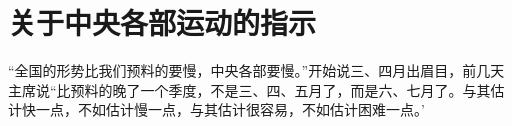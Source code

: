 \section[关于中央各部运动的指示（一九六七年六月）]{关于中央各部运动的指示}


“全国的形势比我们预料的要慢，中央各部要慢。”开始说三、四月出眉目，前几天主席说“比预料的晚了一个季度，不是三、四、五月了，而是六、七月了。与其估计快一点，不如估计慢一点，与其估计很容易，不如估计困难一点。’

